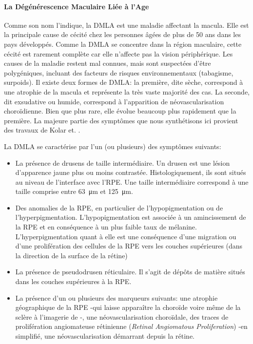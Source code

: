 \paragraph{La Dégénérescence Maculaire Liée à l'Age}
\label{sec:DMLADescription}
Comme son nom l'indique, la \ac{DMLA} est une maladie affectant la macula. Elle est la principale cause de cécité chez les personnes âgées de plus de 50 ans dans les pays développés. Comme la \ac{DMLA} se concentre dans la région maculaire, cette cécité est rarement complète car elle n'affecte pas la vision périphérique. Les causes de la maladie restent mal connues, mais sont suspectées d'être polygéniques, incluant des facteurs de risques environnementaux (tabagisme, surpoids). Il existe deux formes de \ac{DMLA}: la première, dite sèche, correspond à une atrophie de la macula et représente la très vaste majorité des cas. La seconde, dit exsudative ou humide, correspond à l'apparition de néovascularisation choroïdienne. Bien que plus rare, elle évolue beaucoup plus rapidement que la première.
La majeure partie des symptômes que nous synthétisons ici provient des travaux de Kolar et. \cite{kolarClassificationClinicalFeatures2013}. 

La \ac{DMLA} se caractérise par l'un (ou plusieurs) des symptômes suivants:
\begin{itemize}
	\item La présence de drusens de taille intermédiaire. Un drusen est une lésion d'apparence jaune plus ou moins contrastée. Histologiquement, ils sont situés au niveau de l'interface avec l'\ac{RPE}. Une taille intermédiaire correspond à une taille comprise entre \SI{63}{\micro\meter} et \SI{125}{\micro\meter}. 
	\item Des anomalies de la \ac{RPE}, en particulier de l'hypopigmentation ou de l'hyperpigmentation. L'hypopigmentation est associée à un amincissement de la \ac{RPE} et en conséquence à un plus faible taux de mélanine.  L'hyperpigmentation quant à elle est une conséquence d'une migration ou d'une prolifération des cellules de la \ac{RPE} vers les couches supérieures (dans la direction de la surface de la rétine)
	\item La présence de pseudodrusen réticulaire. Il s'agit de dépôts de matière situés dans les couches supérieures à la \ac{RPE}.
	\item La présence d'un ou plusieurs des marqueurs suivants: une atrophie géographique de la \ac{RPE} -qui laisse apparaître la choroïde voire même de la sclère à l'imagerie de \fundus{}-, une néovascularisation choroïdale, des traces de prolifération angiomateuse rétinienne (\textit{Retinal Angiomatous Proliferation}) -en simplifié, une néovascularisation démarrant depuis la rétine.  
\end{itemize}

